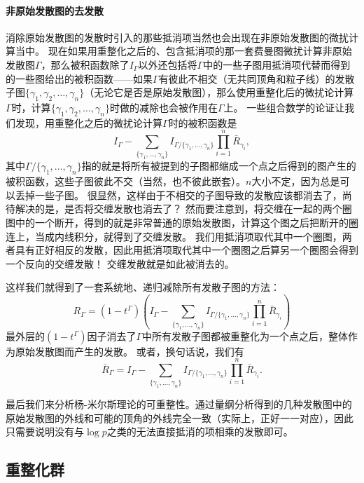 \paragraph{非原始发散图的去发散} 消除原始发散图的发散时引入的那些抵消项当然也会出现在非原始发散图的微扰计算当中。
现在如果用重整化之后的、包含抵消项的那一套费曼图微扰计算非原始发散图$\Gamma$，那么被积函数除了$I_\Gamma$以外还包括将$\Gamma$中的一些子图用抵消项代替而得到的一些图给出的被积函数——如果$\Gamma$有彼此不相交（无共同顶角和粒子线）的发散子图$\{\gamma_1, \gamma_2, \ldots, \gamma_n\}$（无论它是否是原始发散图），那么使用重整化后的微扰论计算$\Gamma$时，计算$\{\gamma_1, \gamma_2, \ldots, \gamma_n\}$时做的减除也会被作用在$\Gamma$上。
一些组合数学的论证让我们发现，用重整化之后的微扰论计算$\Gamma$时的被积函数是
\[
    I_\Gamma - \sum_{\{\gamma_1, \ldots, \gamma_n\}} I_{\Gamma/\{\gamma_1, \ldots, \gamma_n\}} \prod_{i=1}^n \bar{R}_{\gamma_i},
\]
其中$\Gamma/\{\gamma_1, \ldots, \gamma_n\}$指的就是将所有被提到的子图都缩成一个点之后得到的图产生的被积函数，这些子图彼此不交（当然，也不彼此嵌套）。$n$大小不定，因为总是可以丢掉一些子图。
很显然，这样由于不相交的子图导致的发散应该都消去了，尚待解决的是，是否将交缠发散也消去了？
然而要注意到，将交缠在一起的两个圈图中的一个断开，得到的就是非常普通的原始发散图，计算这个图之后把断开的圈连上，当成内线积分，就得到了交缠发散。
我们用抵消项取代其中一个圈图，两者具有正好相反的发散，因此用抵消项取代其中一个圈图之后算另一个圈图会得到一个反向的交缠发散！
交缠发散就是如此被消去的。

这样我们就得到了一套系统地、递归减除所有发散子图的方法：
\begin{equation}
    R_\Gamma = (1 - t^\Gamma)(I_\Gamma - \sum_{\{\gamma_1, \ldots, \gamma_n\}} I_{\Gamma/\{\gamma_1, \ldots, \gamma_n\}} \prod_{i=1}^n \bar{R}_{\gamma_i})
\end{equation}
最外层的$(1-t^\Gamma)$因子消去了$\Gamma$中所有发散子图都被重整化为一个点之后，整体作为原始发散图而产生的发散。
或者，换句话说，我们有
\begin{equation}
    \bar{R}_\Gamma = I_\Gamma - \sum_{\{\gamma_1, \ldots, \gamma_n\}} I_{\Gamma/\{\gamma_1, \ldots, \gamma_n\}} \prod_{i=1}^n \bar{R}_{\gamma_i}.
\end{equation}

最后我们来分析杨-米尔斯理论的可重整性。通过量纲分析得到的几种发散图中的原始发散图的外线和可能的顶角的外线完全一致（实际上，正好一一对应），因此只需要说明没有与$\log p$之类的无法直接抵消的项相乘的发散即可。


\subsection{重整化群}\label{sec:rg}

